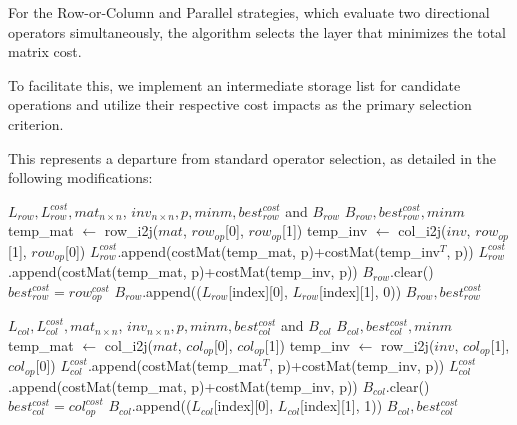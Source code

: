For the Row-or-Column and Parallel strategies, which evaluate two directional operators simultaneously, the algorithm selects the layer that minimizes the total matrix cost. 

To facilitate this, we implement an intermediate storage list for candidate operations and utilize their respective cost impacts as the primary selection criterion. 

This represents a departure from standard operator selection, as detailed in the following modifications:

\begin{algorithm}
\caption{modifiedAvailableRowOperatorSelection}
\begin{algorithmic}[1]
\Require $L_{row}, L_{row}^{cost}, mat_{n \times n}$, $inv_{n \times n}, p, minm, best_{row}^{cost}$ and $B_{row}$
\Ensure $B_{row}, best_{row}^{cost}, minm$
	\State temp\_mat $\leftarrow$ row\_i2j($mat$, $row_{op}$[0], $row_{op}$[1])
	\State temp\_inv $\leftarrow$ col\_i2j($inv$, $row_{op}$[1], $row_{op}$[0])
		\State $L_{row}^{cost}$.append(costMat(temp\_mat, p)+costMat(temp\_inv$^{T}$, p))
	\Else
		\State $L_{row}^{cost}$.append(costMat(temp\_mat, p)+costMat(temp\_inv, p))
	\EndIf
\EndFor
{}
			\State $B_{row}$.clear()
			\State $best_{row}^{cost} = row_{op}^{cost}$
				\State $B_{row}$.append(($L_{row}$[index][0], $L_{row}$[index][1], 0))
            \EndIf
        \EndIf
    \EndIf
\EndFor
\State \Return $B_{row}, best_{row}^{cost}$
\end{algorithmic}
\end{algorithm}

\begin{algorithm}
\caption{modifiedAvailableColOperatorSelection}
\begin{algorithmic}[1]
\Require $L_{col}, L_{col}^{cost}, mat_{n \times n}$, $inv_{n \times n}, p, minm, best_{col}^{cost}$ and $B_{col}$
\Ensure $B_{col}, best_{col}^{cost}, minm$
	\State temp\_mat $\leftarrow$ col\_i2j($mat$, $col_{op}$[0], $col_{op}$[1])
	\State temp\_inv $\leftarrow$ row\_i2j($inv$, $col_{op}$[1], $col_{op}$[0])
		\State $L_{col}^{cost}$.append(costMat(temp\_mat$^{T}$, p)+costMat(temp\_inv, p))
	\Else
		\State $L_{col}^{cost}$.append(costMat(temp\_mat, p)+costMat(temp\_inv, p))
	\EndIf
\EndFor
{}
			\State $B_{col}$.clear()
			\State $best_{col}^{cost} = col_{op}^{cost}$
				\State $B_{col}$.append(($L_{col}$[index][0], $L_{col}$[index][1], 1))
            \EndIf
        \EndIf
    \EndIf
\EndFor
\State \Return $B_{col}, best_{col}^{cost}$
\end{algorithmic}
\end{algorithm}

